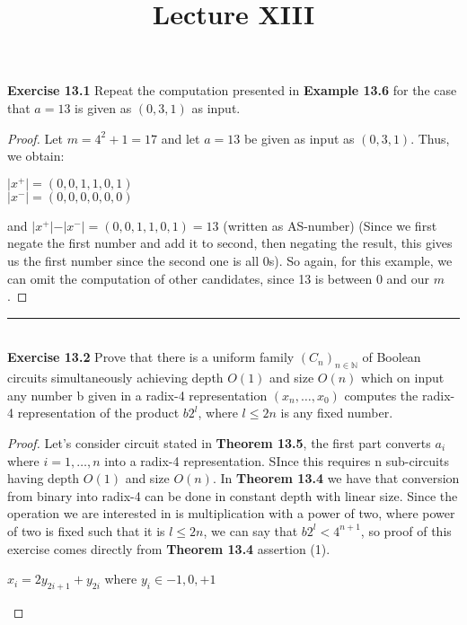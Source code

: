 \documentclass[a4paper]{article}
\title{\vspace{-2cm}Lecture XIII\vspace{-2cm}}
\date{}
\begin{document}
\maketitle
\noindent \textbf{Exercise 13.1}  Repeat the computation presented in \textbf{Example 13.6} for the case that $a = 13$ is given as $(0, 3, 1)$ as input.
\begin{proof}
Let $m = 4^{2} + 1 = 17$ and let $a=13$ be given as input as $(0, 3, 1)$.
Thus, we obtain:
\begin{center}
$\vert x^{+} \vert = (0,0,1,1,0,1)$\\
$\vert x^{-} \vert = (0,0,0,0,0,0)$
\end{center}
and $\vert x^{+} \vert - \vert x^{-} \vert =(0,0,1,1,0,1) =13$ (written as AS-number) (Since we first negate the first number and add it to second, then negating the result, this gives us the first number since the second one is all 0s). So again, for this example, we can omit the computation of other candidates, since 13 is between 0 and our $m$.
\end{proof}



\noindent\rule{12cm}{0.4pt}\\
\noindent \textbf{Exercise 13.2} Prove that there is a uniform family $\left(C_{n}\right)_{n \in \mathbb{N}}$ of Boolean circuits simultaneously achieving depth $O(1)$ and size $O(n)$ which on input any number b given in a radix-4 representation $(x_{n},  \ldots , x_{0})$ computes the radix-4 representation of the product $b2^{l}$, where $l \leq 2n$ is any fixed number.
\begin{proof}
Let's consider circuit stated in \textbf{Theorem 13.5}, the first part converts $a_{i}$ where $i = 1, \ldots, n$ into a radix-4 representation. SInce this requires n sub-circuits having depth $O(1)$ and size $O(n)$. In \textbf{Theorem 13.4} we have that conversion from binary into radix-4 can be done in constant depth with linear size. Since the operation we are interested in is multiplication with a power of two, where power of two is fixed such that it is $l \leq 2n$, we can say that $b2^{l} < 4^{n+1}$, so proof of this exercise comes directly from \textbf{Theorem 13.4} assertion (1).
\begin{center}
$x_{i} = 2y_{2i+1}+y_{2i}$ where $y_{i} \in {-1, 0, +1}$
\end{center}
\end{proof}
\end{document}
